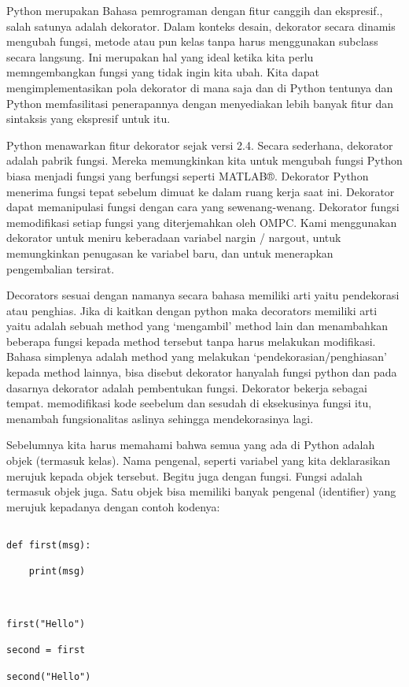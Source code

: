 \documentclass[12pt,a4paper]{article}
\begin{document}
Python merupakan Bahasa pemrograman dengan fitur canggih dan ekspresif., salah satunya adalah dekorator. Dalam konteks desain, dekorator secara dinamis mengubah fungsi, metode atau pun kelas tanpa harus menggunakan subclass secara langsung. Ini merupakan hal yang ideal ketika kita perlu memngembangkan fungsi yang tidak ingin kita ubah. Kita dapat mengimplementasikan pola dekorator di mana saja dan di Python tentunya  dan Python memfasilitasi penerapannya dengan menyediakan lebih banyak fitur dan sintaksis yang ekspresif untuk itu. 



Python menawarkan fitur dekorator sejak versi 2.4. Secara sederhana, dekorator adalah pabrik fungsi. Mereka memungkinkan kita untuk mengubah fungsi Python biasa menjadi fungsi yang berfungsi seperti MATLAB®. Dekorator Python menerima fungsi tepat sebelum dimuat ke dalam ruang kerja saat ini. Dekorator dapat memanipulasi fungsi dengan cara yang sewenang-wenang. Dekorator fungsi memodifikasi setiap fungsi yang diterjemahkan oleh OMPC. Kami menggunakan dekorator untuk meniru keberadaan variabel nargin / nargout, untuk memungkinkan penugasan ke variabel baru, dan untuk menerapkan pengembalian tersirat.

Decorators sesuai dengan namanya secara bahasa memiliki arti yaitu pendekorasi atau penghias. Jika di kaitkan dengan python maka decorators memiliki arti yaitu adalah sebuah method yang ‘mengambil’ method lain dan menambahkan beberapa fungsi kepada method tersebut tanpa harus melakukan modifikasi. Bahasa simplenya adalah method yang melakukan ‘pendekorasian/penghiasan’ kepada method lainnya, bisa disebut dekorator hanyalah fungsi python dan pada dasarnya dekorator adalah pembentukan fungsi. Dekorator bekerja sebagai tempat. memodifikasi kode seebelum dan sesudah di eksekusinya fungsi itu, menambah fungsionalitas aslinya sehingga mendekorasinya lagi.



Sebelumnya kita harus memahami bahwa semua yang ada di Python adalah objek (termasuk kelas). Nama pengenal, seperti variabel yang kita deklarasikan merujuk kepada objek tersebut. Begitu juga dengan fungsi. Fungsi adalah termasuk objek juga. Satu objek bisa memiliki banyak pengenal (identifier) yang merujuk kepadanya dengan contoh kodenya:



\begin{verbatim}

def first(msg):

    print(msg)



first("Hello")

second = first

second("Hello")

\end{verbatim}
\end{document}
